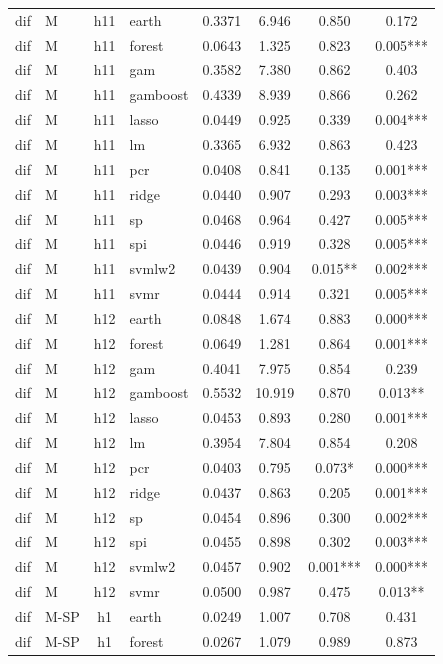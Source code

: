 \begin{ThreePartTable}
\begin{longtable}[t]{llclcccc}
\addlinespace
dif & M & h11 & earth & 0.3371 & 6.946 & 0.850 & 0.172\\
dif & M & h11 & forest & 0.0643 & 1.325 & 0.823 & 0.005***\\
dif & M & h11 & gam & 0.3582 & 7.380 & 0.862 & 0.403\\
dif & M & h11 & gamboost & 0.4339 & 8.939 & 0.866 & 0.262\\
dif & M & h11 & lasso & 0.0449 & 0.925 & 0.339 & 0.004***\\
dif & M & h11 & lm & 0.3365 & 6.932 & 0.863 & 0.423\\
dif & M & h11 & pcr & 0.0408 & 0.841 & 0.135 & 0.001***\\
dif & M & h11 & ridge & 0.0440 & 0.907 & 0.293 & 0.003***\\
dif & M & h11 & sp & 0.0468 & 0.964 & 0.427 & 0.005***\\
dif & M & h11 & spi & 0.0446 & 0.919 & 0.328 & 0.005***\\
dif & M & h11 & svmlw2 & 0.0439 & 0.904 & 0.015** & 0.002***\\
dif & M & h11 & svmr & 0.0444 & 0.914 & 0.321 & 0.005***\\
\addlinespace
dif & M & h12 & earth & 0.0848 & 1.674 & 0.883 & 0.000***\\
dif & M & h12 & forest & 0.0649 & 1.281 & 0.864 & 0.001***\\
dif & M & h12 & gam & 0.4041 & 7.975 & 0.854 & 0.239\\
dif & M & h12 & gamboost & 0.5532 & 10.919 & 0.870 & 0.013**\\
dif & M & h12 & lasso & 0.0453 & 0.893 & 0.280 & 0.001***\\
dif & M & h12 & lm & 0.3954 & 7.804 & 0.854 & 0.208\\
dif & M & h12 & pcr & 0.0403 & 0.795 & 0.073* & 0.000***\\
dif & M & h12 & ridge & 0.0437 & 0.863 & 0.205 & 0.001***\\
dif & M & h12 & sp & 0.0454 & 0.896 & 0.300 & 0.002***\\
dif & M & h12 & spi & 0.0455 & 0.898 & 0.302 & 0.003***\\
dif & M & h12 & svmlw2 & 0.0457 & 0.902 & 0.001*** & 0.000***\\
dif & M & h12 & svmr & 0.0500 & 0.987 & 0.475 & 0.013**\\
\addlinespace
dif & M-SP & h1 & earth & 0.0249 & 1.007 & 0.708 & 0.431\\
dif & M-SP & h1 & forest & 0.0267 & 1.079 & 0.989 & 0.873\\

\end{longtable}
\end{ThreePartTable}
